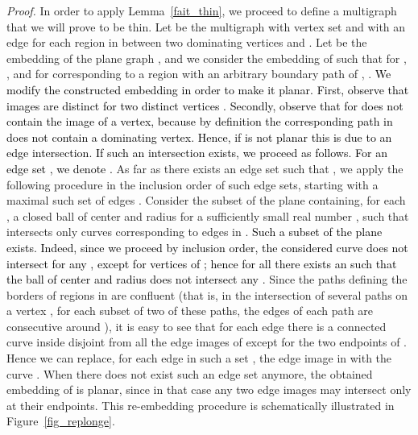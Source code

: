 \documentclass[a4paper,11pt]{article}
\newenvironment{proof}{\noindent \textit{Proof. }}{\hfill\vspace{.2cm}}
\newcommand{\addOK}   [1] {\textcolor{black} {#1}}
\newcommand{\modifOK} [2] {\addOK{#2}}
\newcommand{\ig}[1]{\textcolor{blue}{\fbox{\fbox{\textcolor{blue}{#1}}}}}
\begin{document}
\begin{proof}
In order to apply Lemma~\ref{fait_thin}, we proceed to define a multigraph that we will prove to be thin. Let  be the multigraph with vertex set  and with an edge  for each region in  between two dominating vertices  and . Let  be the embedding of the plane graph , and we consider the embedding  of  such that for , ,  and for  corresponding to a region  with  an arbitrary boundary path of , . \modifOK{(note that such a path does not contain inner dominating vertices, hence  does not contain vertex images). For an edge set , we denote . If the constructed embedding is not planar, we proceed to modify it in order to make it planar as follows. Given , observe that if  then .}{We modify the constructed embedding  in order to make it planar. First, observe that images  are distinct for two distinct vertices . Secondly, observe that  for  does not contain the image of a vertex, because  by definition the corresponding path in  does not contain a dominating vertex. Hence, if  is not planar this is due to an edge intersection. If such an intersection exists, we proceed as follows. For an edge set , we denote .} As far as there
exists an edge set  such that , we apply the following procedure in the inclusion order of such edge sets, starting with a maximal such set of edges .
Consider the subset of the plane  containing, for each , a closed ball of center  and radius  for a sufficiently small real number ,
such that  intersects only curves corresponding to edges in . \modifOK{; note that such a subset of the plane exists, since  forms a sharp corner around dominating vertices \ig{il faudrait donner un petit argument de pourquoi  fait un ``sharp corner''} and does not contain them, and since we proceed by inclusion order\\ \ig{pourquoi le faire par ``inclusion order'' garantit l'existence d'?}.}{Such a subset  of the plane exists. Indeed, since we proceed by inclusion order, the considered curve  does not intersect  for any , except for vertices of ; hence for all  there exists an  such that the ball of center  and radius  does not intersect any .} Since the paths defining the borders of regions in  are confluent (that is,  in the intersection of several paths on a vertex , for each subset of two of these paths, the edges of each path are consecutive around ), it is easy to see that for each edge  there is a connected curve  inside  disjoint from all the edge images of  except for the two endpoints of . Hence we can replace, for each edge  in such a set , the edge image  in  with the curve . When there does not exist such an edge set  anymore, the obtained embedding of  is planar, since in that case any two edge images may intersect only at their endpoints. This re-embedding procedure is schematically illustrated in Figure~\ref{fig_replonge}.



\end{proof}
\end{document}
